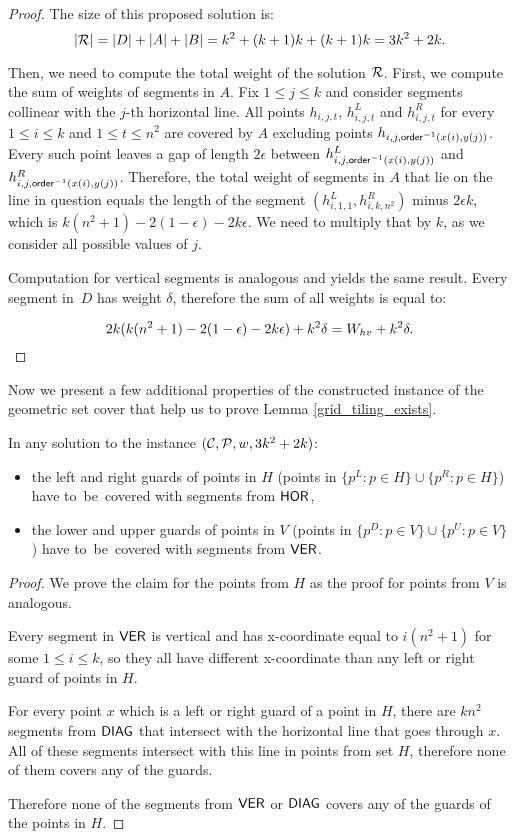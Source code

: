 \begin{proof}
The size of this proposed solution is:
$$|\mathcal{R}| = |D| + |A| + |B| = k^2 + (k+1)k + (k+1)k = 3k^2+2k.$$

Then, we need to compute the total weight of the solution $\mathcal{R}$.
First, we compute the sum of weights of segments in $A$.
Fix $1 \le j \le k$ and consider segments collinear
with the $j$-th horizontal line.
All points $h_{i,j,t}$, $h_{i,j,t}^L$ and $h_{i,j,t}^R$
for every $1 \le i \le k$ and $1 \le t \le n^2$ are covered by $A$
excluding points $h_{i,j,\mathsf{order}^{-1}(x(i),y(j))}$.
Every such point leaves a gap of length $2\epsilon$ between
$h_{i,j,\mathsf{order}^{-1}(x(i),y(j))}^L$ and $h_{i,j,\mathsf{order}^{-1}(x(i),y(j))}^R$.
Therefore, the total weight of segments in $A$
that lie on the line in question equals the length of the segment
$(h_{i,1,1}^L, h_{i,k,n^2}^R)$
minus $2\epsilon k$, which is $k(n^2+1) -2(1-\epsilon)-2k\epsilon$.
We need to multiply that by $k$, as we consider all possible values of $j$.

Computation for vertical segments is analogous and yields the same result.
Every segment in~$D$ has weight $\delta$, therefore the sum of all weights
is equal to:

$$2k(k(n^2+1) -2(1-\epsilon)-2k\epsilon) + k^2\delta= W_{hv} +k^2\delta.$$
\end{proof}

Now we present a few additional properties of the constructed instance
of the geometric set cover that help us to prove
Lemma \ref{grid_tiling_exists}.

\begin{claim}
\label{guards}
In any solution to the instance $(\mathcal{C}, \mathcal{P}, w, 3k^2+2k)$:
\begin{itemize}
\item the left and right guards of points in $H$
(points in $\{p^L : p \in H\} \cup \{p^R : p \in H\}$)
have to~be~covered with segments from $\mathsf{HOR}$,
\item the lower and upper guards of points in $V$
(points in $\{p^D : p \in V\} \cup \{p^U : p \in V\}$)
have to~be~covered with segments from $\mathsf{VER}$.
\end{itemize}
\end{claim}

\begin{proof}
We prove the claim for the points from $H$
as the proof for points from $V$ is analogous.

Every segment in $\mathsf{VER}$ is vertical and 
has x-coordinate equal to $i(n^2+1)$ for some $1\le i \le k$,
so they all have different x-coordinate
than any left or right guard of points in $H$.

For every point $x$ which is a left or right guard of a point in $H$,
there are $kn^2$ segments from $\mathsf{DIAG}$ that intersect with the horizontal
line that goes through $x$. All of these segments intersect with
this line in points from set $H$, therefore none of them
covers any of the guards.

Therefore none of the segments from $\mathsf{VER}$ or $\mathsf{DIAG}$ covers any
of the guards of the points in $H$.
\end{proof}

